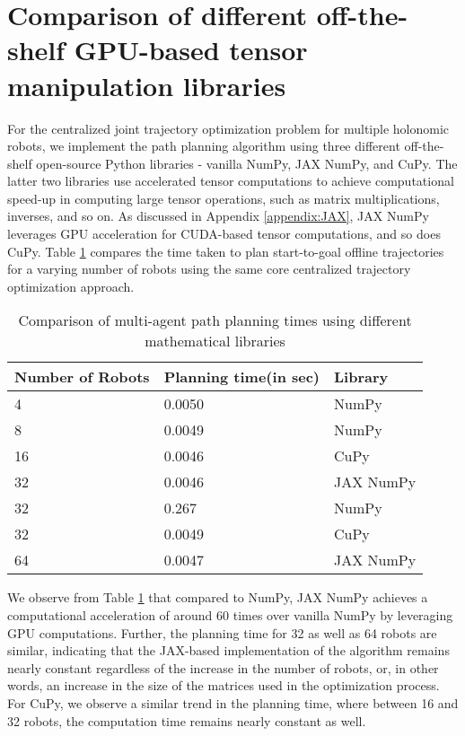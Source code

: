\section{\label{appendix:GPU-acc-comparison}Comparison of different off-the-shelf GPU-based tensor manipulation libraries}

For the centralized joint trajectory optimization problem for multiple holonomic robots, we implement the path planning algorithm using three different off-the-shelf open-source Python libraries - vanilla NumPy, JAX NumPy, and CuPy. The latter two libraries use accelerated tensor computations to achieve computational speed-up in computing large tensor operations, such as matrix multiplications, inverses, and so on. As discussed in Appendix \ref{appendix:JAX}, JAX NumPy leverages GPU acceleration for CUDA-based tensor computations, and so does CuPy. Table \ref{table: gpu-acc-comp} compares the time taken to plan start-to-goal offline trajectories for a varying number of robots using the same core centralized trajectory optimization approach.

\begin{table}
\centering
\caption{Comparison of multi-agent path planning times using different mathematical libraries} \label{table: gpu-acc-comp}
\scriptsize
\begin{tabular}{|p{3cm}|p{3cm}|p{3cm}|}\hline
 Number of Robots & Planning time(in sec) & Library
\\ \hline
4 & 0.0050 & NumPy
\\ \hline
8 & 0.0049 & NumPy
\\ \hline
16 & 0.0046 & CuPy
\\ \hline
32 & 0.0046 & JAX NumPy
\\ \hline
32 & 0.267 & NumPy
\\ \hline
32 & 0.0049 & CuPy
\\ \hline
64 & 0.0047 & JAX NumPy
\\ \hline
\end{tabular}
\normalsize
\vspace{-0.4cm}
\end{table}

We observe from Table \ref{table: gpu-acc-comp} that compared to NumPy, JAX NumPy achieves a computational acceleration of around $60$ times over vanilla NumPy by leveraging GPU computations. Further, the planning time for 32 as well as 64 robots are similar, indicating that the JAX-based implementation of the algorithm remains nearly constant regardless of the increase in the number of robots, or, in other words, an increase in the size of the matrices used in the optimization process. For CuPy, we observe a similar trend in the planning time, where between 16 and 32 robots, the computation time remains nearly constant as well. 
